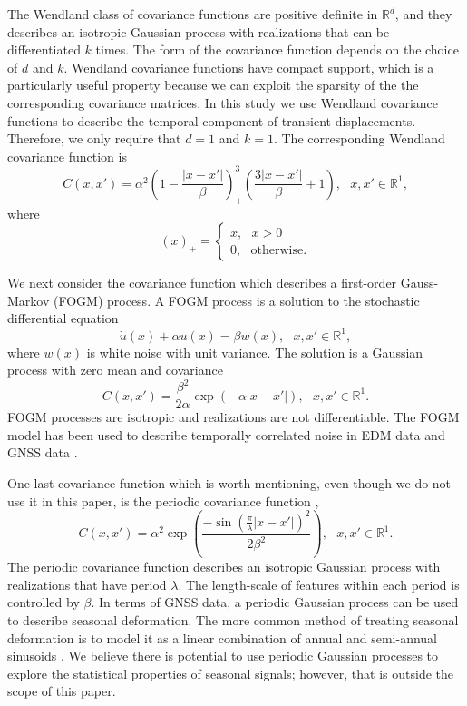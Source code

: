 \documentclass[10pt,a4paper]{article}
\begin{document}
The Wendland class of covariance functions \citep{Wendland2005} are positive definite in $\mathbb{R}^d$, and they describes an isotropic Gaussian process with realizations that can be differentiated $k$ times. The form of the covariance function depends on the choice of $d$ and $k$. Wendland covariance functions have compact support, which is a particularly useful property because we can exploit the sparsity of the the corresponding covariance matrices. In this study we use Wendland covariance functions to describe the temporal component of transient displacements. Therefore, we only require that $d=1$ and $k=1$. The corresponding Wendland covariance function is 
\begin{equation}\label{eq:Wendland}
C(x,x') = \alpha^2\left(1 - \frac{|x - x'|}{\beta}\right)^3_+ \left(\frac{3|x - x'|}{\beta} + 1\right), \ \ \ x,x' \in \mathbb{R}^1,
\end{equation}
where
\begin{equation}
(x)_+ = 
\begin{cases}
x, \ \ \ x > 0 \\
0, \ \ \ \mathrm{otherwise}.
\end{cases}
\end{equation}

We next consider the covariance function which describes a first-order Gauss-Markov (FOGM) process. A FOGM process is a solution to the stochastic differential equation
\begin{equation}
\dot{u}(x) + \alpha u(x) = \beta w(x), \ \ \ x,x' \in \mathbb{R}^1,
\end{equation}
where $w(x)$ is white noise with unit variance.  The solution is a Gaussian process with zero mean and covariance
\begin{equation}\label{eq:FOGM}
C(x,x') = \frac{\beta^2}{2\alpha}\exp\left(-\alpha|x - x'|\right), \ \ \ x,x' \in \mathbb{R}^1. 
\end{equation}
FOGM processes are isotropic and realizations are not differentiable.  The FOGM model has been used to describe temporally correlated noise in EDM data \citep{Langbein2004} and GNSS data \citep[e.g.,][]{Langbein2008}. 

One last covariance function which is worth mentioning, even though we do not use it in this paper, is the periodic covariance function \citep{Mackay1998}, 
\begin{equation}\label{eq:Periodic}
C(x,x') = \alpha^2 \exp\left(\frac{-\sin(\frac{\pi}{\lambda} |x - x'|)^2}{2 \beta^2} \right), \ \ \ x,x' \in \mathbb{R}^1.
\end{equation}
The periodic covariance function describes an isotropic Gaussian process with realizations that have period $\lambda$.  The length-scale of features within each period is controlled by $\beta$. In terms of GNSS data, a periodic Gaussian process can be used to describe seasonal deformation. The more common method of treating seasonal deformation is to model it as a linear combination of annual and semi-annual sinusoids \citep[e.g.,][]{Blewitt2002}. We believe there is potential to use periodic Gaussian processes to explore the statistical properties of seasonal signals; however, that is outside the scope of this paper.   
\end{document}
